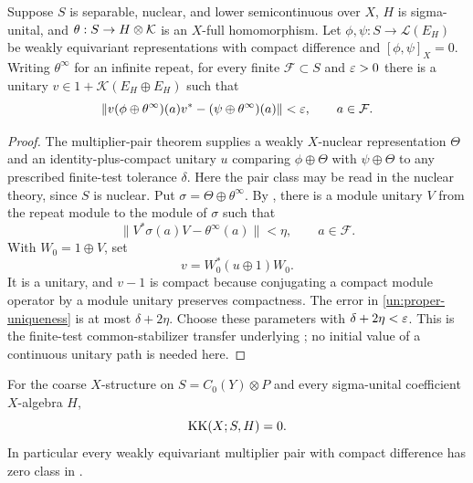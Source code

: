 \begin{proposition}\label{un:stable-uniqueness}
Suppose $S$ is separable, nuclear, and lower semicontinuous over $X$,
$H$ is sigma-unital, and $\theta:S\to H\otimes\mathcal K$ is an $X$-full
homomorphism.
Let $\phi,\psi:S\to\mathcal L(E_H)$ be weakly equivariant
representations with compact difference and $[\phi,\psi]_X=0$.
Writing $\theta^\infty$ for an infinite repeat, for every finite
$\mathcal F\subset S$ and $\varepsilon>0$ there is a unitary
$v\in1+\mathcal K(E_H\oplus E_H)$ such that
\begin{equation}\label{un:proper-uniqueness}
 \|v(\phi\oplus\theta^\infty)(a)v^*
       -(\psi\oplus\theta^\infty)(a)\|<\varepsilon,
 \qquad a\in\mathcal F.
\end{equation}
\end{proposition}

\begin{proof}
The multiplier-pair theorem \cite[Theorem~13.9]{Gabe} supplies a
weakly $X$-nuclear representation $\Theta$ and an identity-plus-compact
unitary $u$ comparing $\phi\oplus\Theta$ with $\psi\oplus\Theta$
to any prescribed finite-test tolerance $\delta$.  Here the pair
class may be read in the nuclear theory, since $S$ is nuclear.
Put $\sigma=\Theta\oplus\theta^\infty$.  By
, there is a module unitary $V$ from the repeat
module to the module of $\sigma$ such that
\[
 \|V^*\sigma(a)V-\theta^\infty(a)\|<\eta,
 \qquad a\in\mathcal F.
\]
With $W_0=1\oplus V$, set
\[
 v=W_0^*(u\oplus1)W_0.
\]
It is a unitary, and $v-1$ is compact because conjugating a compact
module operator by a module unitary preserves compactness.  The
error in \eqref{un:proper-uniqueness} is at most $\delta+2\eta$.
Choose these parameters with $\delta+2\eta<\varepsilon$.
This is the finite-test common-stabilizer transfer underlying
\cite[Lemmas~2.4 and~3.4]{DadarlatEilers}; no initial value of a
continuous unitary path is needed here.
\end{proof}

\begin{lemma}\label{un:KK-nullity}
For the coarse $X$-structure on $S=C_0(Y)\otimes P$ and every
sigma-unital coefficient $X$-algebra $H$,
\[
 \operatorname{KK}(X;S,H)=0.
\]
In particular every weakly equivariant multiplier pair with compact
difference has zero class in .
\end{lemma}


